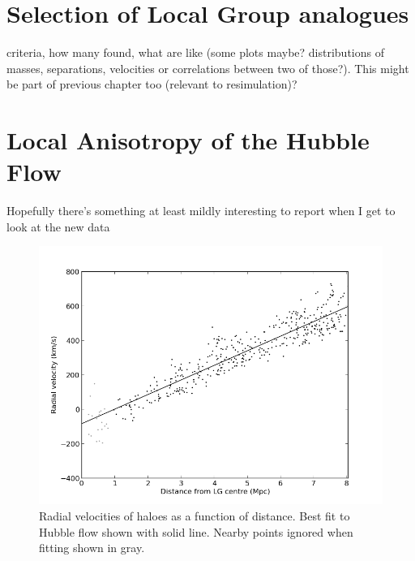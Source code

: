 \documentclass[english, oneside]{HYgradu}
\begin{document}
\section{Selection of Local Group analogues}
criteria, how many found, what are like (some plots maybe? distributions of masses, separations, velocities or correlations between two of those?). This might be part of previous chapter too (relevant to resimulation)?

\section{Local Anisotropy of the Hubble Flow}
Hopefully there's something at least mildly interesting to report when I get to look at the new data


\begin{figure}
   \centering
   \includegraphics[width=\textwidth]{kuvat/hubbleflow.png}
   \caption{Radial velocities of haloes as a function of distance. Best fit to Hubble flow shown with solid line. Nearby points ignored when fitting shown in gray.}\label{fig:hubbleflow}
\end{figure}
\end{document}
